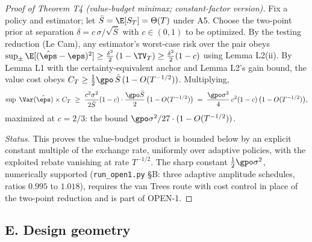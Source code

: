 \begin{proof}[Proof of Theorem T4 (value-budget minimax; constant-factor
version)]
Fix a policy and estimator; let $\bar S = \E[S_T] = \Theta(T)$ under A5.
Choose the two-point prior at separation $\delta = c\,\sigma/\sqrt{\bar S}$
with $c \in (0,1)$ to be optimized. By the testing reduction (Le Cam), any
estimator's worst-case risk over the pair obeys
$\sup_{\pm} \E[(\hat\eps - \eps)^2] \ge \tfrac{\delta^2}{2}\,(1 - \TV_T)
\ge \tfrac{\delta^2}{2}(1 - c)$ using Lemma L2(ii). By Lemma L1 with the
certainty-equivalent anchor and Lemma L2's gain bound, the value cost obeys
$C_T \ge \tfrac{1}{2}\gpo\,\bar S\,(1 - O(T^{-1/2}))$. Multiplying,
\[
\sup\; \Var(\hat\eps)\times C_T
 \;\ge\; \frac{c^2\sigma^2}{2\bar S}(1-c)\cdot
 \frac{\gpo \bar S}{2}\,\big(1 - O(T^{-1/2})\big)
 \;=\; \frac{\gpo\sigma^2}{4}\,c^2(1-c)\,\big(1 - O(T^{-1/2})\big),
\]
maximized at $c = 2/3$: the bound $\gpo\sigma^2/27 \cdot (1 - O(T^{-1/2}))$.

\emph{Status.} This proves the value-budget product is bounded below by an
explicit constant multiple of the exchange rate, uniformly over adaptive
policies, with the exploited rebate vanishing at rate $T^{-1/2}$. The
sharp constant $\tfrac{1}{2}\gpo\sigma^2$, numerically supported
(\texttt{run\_open1.py} \S B: three adaptive amplitude schedules, ratios
$0.995$ to $1.018$), requires the van Trees route with
cost control in place of the two-point reduction and is part of OPEN-1.
\end{proof}

\subsection*{E. Design geometry}

